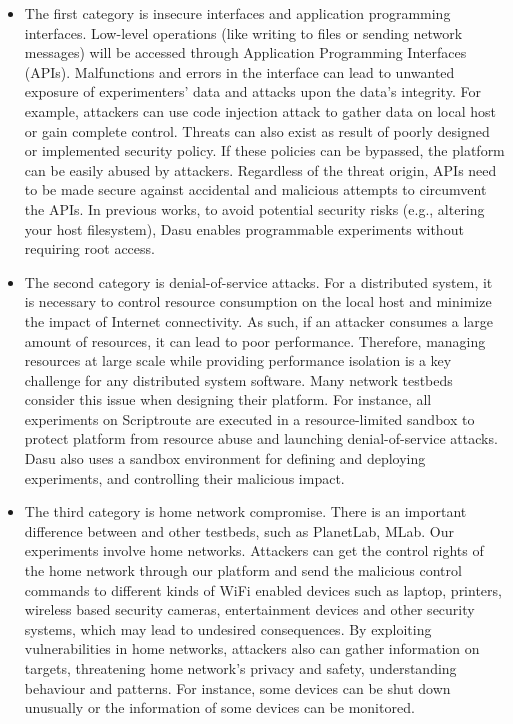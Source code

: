 \begin{itemize}
\item The first category is insecure interfaces and application programming interfaces. Low-level operations (like writing to files or sending network messages) will be accessed through Application Programming Interfaces (APIs). Malfunctions and errors in the interface can lead to unwanted exposure of experimenters' data and attacks upon the data's integrity. For example, attackers can use code injection attack to gather data on local host or gain complete control. Threats can also exist as result of poorly designed or implemented security policy. If these policies can be bypassed, the platform can be easily abused by attackers. Regardless of the threat origin, APIs need to be made secure against accidental and malicious attempts to circumvent the APIs. In previous works, to avoid potential security risks (e.g., altering your host filesystem), Dasu\cite{sanchez2014measurement} enables programmable experiments without requiring root access. 

\item The second category is denial-of-service attacks. For a distributed system, it is necessary to control resource consumption on the local host and minimize the impact of Internet connectivity. As such, if an attacker consumes a large amount of resources, it can lead to poor performance. Therefore, managing resources at large scale while providing performance isolation is a key challenge for any distributed system software. Many network testbeds consider this issue when designing their platform. For instance, all experiments on Scriptroute\cite{spring2003scriptroute} are executed in a resource-limited sandbox to protect platform from resource abuse and launching denial-of-service attacks. Dasu also uses a sandbox environment for defining and deploying experiments, and controlling their malicious impact.

\item The third category is home network compromise. There is an important difference between \sysname and other testbeds, such as PlanetLab, MLab. Our experiments involve home networks. Attackers can get the control rights of the home network through our platform and send the malicious control commands to different kinds of WiFi enabled devices such as laptop, printers, wireless based security cameras, entertainment devices and other security systems, which may lead to undesired consequences. By exploiting vulnerabilities in home networks, attackers also can gather information on targets, threatening home network's privacy and safety, understanding behaviour and patterns. For instance, some devices can be shut down unusually or the information of some devices can be monitored.


\end{itemize}
